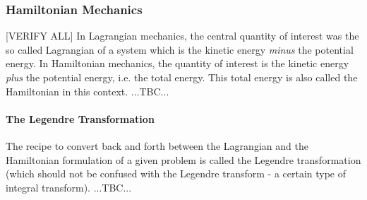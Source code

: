 %


\subsubsection{Hamiltonian Mechanics} [VERIFY ALL]
In Lagrangian mechanics, the central quantity of interest was the so called Lagrangian of a system which is the kinetic energy \emph{minus} the potential energy. In Hamiltonian mechanics, the quantity of interest is the kinetic energy \emph{plus} the potential energy, i.e. the total energy. This total energy is also called the Hamiltonian in this context. ...TBC...

\paragraph{The Legendre Transformation}
The recipe to convert back and forth between the Lagrangian and the Hamiltonian formulation of a given problem is called the Legendre transformation (which should not be confused with the Legendre transform - a certain type of integral transform). ...TBC...






